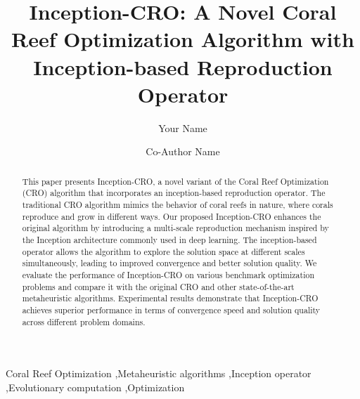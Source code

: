\documentclass[review]{elsarticle}
\begin{document}
\begin{frontmatter}



\title{Inception-CRO: A Novel Coral Reef Optimization Algorithm with Inception-based Reproduction Operator}


\author[1]{Your Name}
\author[2]{Co-Author Name}

\address[1]{Department, University, City, Country}
\address[2]{Department, University, City, Country}

\begin{abstract}
This paper presents Inception-CRO, a novel variant of the Coral Reef Optimization (CRO) algorithm that incorporates an inception-based reproduction operator. The traditional CRO algorithm mimics the behavior of coral reefs in nature, where corals reproduce and grow in different ways. Our proposed Inception-CRO enhances the original algorithm by introducing a multi-scale reproduction mechanism inspired by the Inception architecture commonly used in deep learning. The inception-based operator allows the algorithm to explore the solution space at different scales simultaneously, leading to improved convergence and better solution quality. We evaluate the performance of Inception-CRO on various benchmark optimization problems and compare it with the original CRO and other state-of-the-art metaheuristic algorithms. Experimental results demonstrate that Inception-CRO achieves superior performance in terms of convergence speed and solution quality across different problem domains.
\end{abstract}

\begin{keyword}
Coral Reef Optimization \sep Metaheuristic algorithms \sep Inception operator \sep Evolutionary computation \sep Optimization
\end{keyword}

\end{frontmatter}
\end{document}
